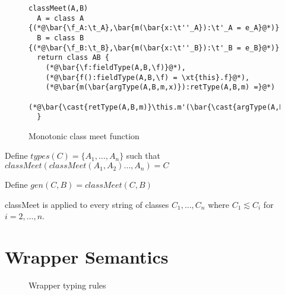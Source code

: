 \documentclass{sigplanconf}
\begin{document}
\begin{figure}
\begin{lstlisting}
classMeet(A,B)
  A = class A {(*@\bar{\f_A:\t_A},\bar{m(\bar{x:\t''_A}):\t'_A = e_A}@*)}
  B = class B {(*@\bar{\f_B:\t_B},\bar{m(\bar{x:\t''_B}):\t'_B = e_B}@*)}
  return class AB {
    (*@\bar{\f:fieldType(A,B,\f)}@*),
    (*@\bar{f():fieldType(A,B,\f) = \xt{this}.f}@*),
    (*@\bar{m(\bar{argType(A,B,m,x)}):retType(A,B,m) =}@*)
    	(*@\bar{\cast{retType(A,B,m)}\this.m'(\bar{\cast{argType(A,B,m,x)}x})}@*)
  }
\end{lstlisting}
\caption{Monotonic class meet function}
\end{figure}

Define $types(C) = \{A_1,\ldots,A_n\}$ such that $classMeet(classMeet(A_1,A_2)\ldots,A_n) = C$

Define $gen(C, B) = classMeet(C,B)$

classMeet is applied to every string of classes $C_1,\ldots,C_n$ where $C_1 \lesssim C_i$ for $i=2,\ldots,n$.

\section{Wrapper Semantics}


\begin{figure}
\begin{mathpar}




\end{mathpar}
\caption{Wrapper typing rules}
\end{figure}
\end{document}
